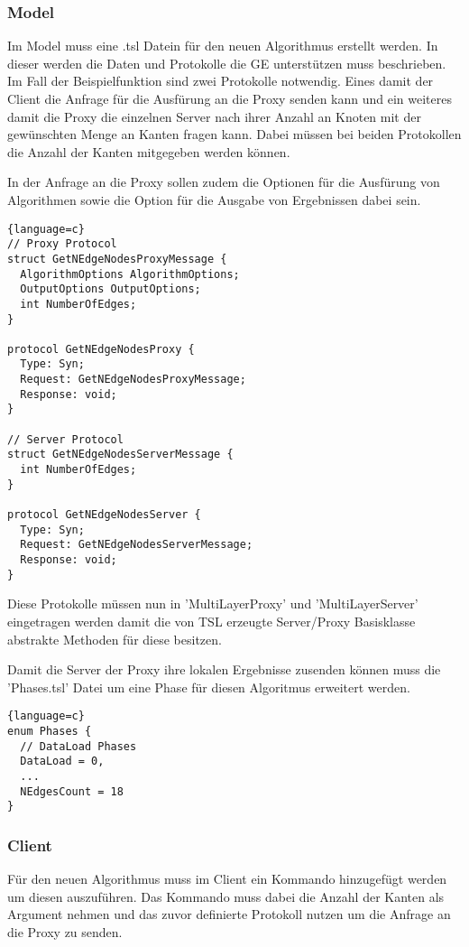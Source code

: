 \subsubsection{Model}

Im Model muss eine .tsl Datein für den neuen Algorithmus erstellt werden. In dieser werden die Daten und Protokolle die GE unterstützen muss beschrieben. Im Fall der Beispielfunktion sind zwei Protokolle notwendig.
Eines damit der Client die Anfrage für die Ausfürung an die Proxy senden kann und ein weiteres damit die Proxy die einzelnen Server nach ihrer Anzahl an Knoten mit der gewünschten Menge an Kanten fragen kann.
Dabei müssen bei beiden Protokollen die Anzahl der Kanten mitgegeben werden können.

In der Anfrage an die Proxy sollen zudem die Optionen für die Ausfürung von Algorithmen sowie die Option für die Ausgabe von Ergebnissen dabei sein.

\begin{lstlisting}{language=c}
// Proxy Protocol
struct GetNEdgeNodesProxyMessage {
  AlgorithmOptions AlgorithmOptions;
  OutputOptions OutputOptions;
  int NumberOfEdges;  
}

protocol GetNEdgeNodesProxy {
  Type: Syn;
  Request: GetNEdgeNodesProxyMessage;
  Response: void;
}

// Server Protocol
struct GetNEdgeNodesServerMessage {
  int NumberOfEdges;
}

protocol GetNEdgeNodesServer {
  Type: Syn;
  Request: GetNEdgeNodesServerMessage;
  Response: void;
}
\end{lstlisting}

Diese Protokolle müssen nun in 'MultiLayerProxy' und 'MultiLayerServer' eingetragen werden damit die von TSL erzeugte Server/Proxy Basisklasse abstrakte Methoden für diese besitzen.

Damit die Server der Proxy ihre lokalen Ergebnisse zusenden können muss die 'Phases.tsl' Datei um eine Phase für diesen Algoritmus erweitert werden.

\begin{lstlisting}{language=c}
enum Phases {
  // DataLoad Phases
  DataLoad = 0,
  ...
  NEdgesCount = 18
}
\end{lstlisting}


\subsubsection{Client}

Für den neuen Algorithmus muss im Client ein Kommando hinzugefügt werden um diesen auszuführen. Das Kommando muss dabei die Anzahl der Kanten als Argument nehmen und das zuvor definierte Protokoll nutzen um die Anfrage an die Proxy zu senden.

